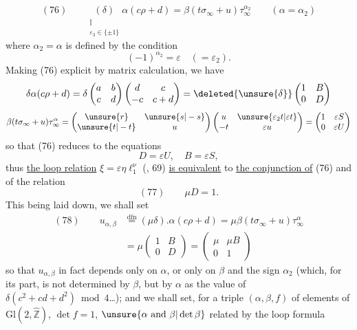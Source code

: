 \[
(76)\qquad
\underset{\substack{\Vert\\\varepsilon_3\in\{\pm1\}}}{(\delta)}
\alpha(c\rho+d)=\beta(t\sigma_\infty+u)\tau_\infty^{\alpha_2}
\qquad(\alpha=\alpha_2)
\]
where $\alpha_2=\alpha$ is defined by the condition
\[
(-1)^{\alpha_2}=\varepsilon\quad(=\varepsilon_2).
\]
Making (76) explicit by matrix calculation, we have
\[
\delta\alpha(c\rho+d)
=\delta\begin{pmatrix}a&b\\c&d\end{pmatrix}
\begin{pmatrix}d&c\\-c&c+d\end{pmatrix}
=\deleted{\unsure{\delta}}
\begin{pmatrix}1&B\\0&D\end{pmatrix}
\]
\[
\beta(t\sigma_\infty+u)\tau_\infty^\alpha
=\begin{pmatrix}\unsure{r}&\unsure{s|-s}\\\unsure{t|-t}&u\end{pmatrix}
\begin{pmatrix}u&\unsure{\varepsilon_2t|\varepsilon t}\\-t&\varepsilon u\end{pmatrix}
=\begin{pmatrix}1&\varepsilon S\\0&\varepsilon U\end{pmatrix}
\]
so that (76) reduces to the equations
\[
D=\varepsilon U,\quad B=\varepsilon S,
\]
thus \uline{the loop relation} $\xi=\varepsilon\eta \ell_1^\nu$ (, 69) \uline{is equivalent} to \uline{the conjunction of} (76) and of the relation
\[
(77)\qquad\mu D=1.
\]
This being laid down, we shall set 
\[
\begin{aligned}
(78)\qquad u_{\alpha,\beta}
&\overset{\mathrm{dfn}}{=}(\mu\delta).\alpha(c\rho+d)
=\mu\beta(t\sigma_\infty+u)\tau_\infty^\alpha\\
&=\mu\begin{pmatrix}1&B\\0&D\end{pmatrix}
=\begin{pmatrix}\mu&\mu B\\0&1\end{pmatrix}
\end{aligned}
\]
so that $u_{\alpha,\beta}$ in fact depends only on $\alpha$, or only on $\beta$ and the sign $\alpha_2$ (which, for its part, is not determined by $\beta$, but by $\alpha$ as the value of $\delta(c^2+cd+d^2)\bmod4$\dots); and we shall set, for a triple $(\alpha,\beta,f)$ of elements of $\mathrm{Gl}(2,\widehat{\mathbb Z})$, $\det f=1$, $\unsure{\alpha\text{ and }\beta|\det\beta}$ related by the loop formula

